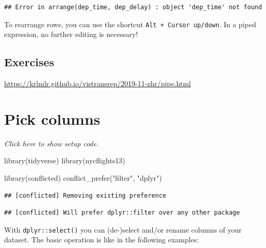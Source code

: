 \documentclass[]{book}
\newenvironment{Shaded}{}{}
\newcommand{\KeywordTok}[1]{\textcolor[rgb]{0.00,0.00,1.00}{#1}}
\newcommand{\NormalTok}[1]{#1}
\newcommand{\OperatorTok}[1]{#1}
\newcommand{\StringTok}[1]{\textcolor[rgb]{0.00,0.50,0.50}{#1}}
\begin{document}
\begin{verbatim}
## Error in arrange(dep_time, dep_delay) : object 'dep_time' not found
\end{verbatim}

To rearrange rows, you can use the shortcut \texttt{Alt\ +\ Cursor\ up/down}.
In a piped expression, no further editing is necessary!

\hypertarget{exercises-2}{%
\subsection*{Exercises}\label{exercises-2}}

\url{https://krlmlr.github.io/vistransrep/2019-11-zhr/pipe.html}

\hypertarget{pick-columns}{%
\section{Pick columns}\label{pick-columns}}

\emph{Click here to show setup code.}

\begin{Shaded}
\begin{Highlighting}[]
\KeywordTok{library}\NormalTok{(tidyverse)}
\KeywordTok{library}\NormalTok{(nycflights13)}

\KeywordTok{library}\NormalTok{(conflicted)}
\KeywordTok{conflict_prefer}\NormalTok{(}\StringTok{"filter"}\NormalTok{, }\StringTok{"dplyr"}\NormalTok{)}
\end{Highlighting}
\end{Shaded}

\begin{verbatim}
## [conflicted] Removing existing preference
\end{verbatim}

\begin{verbatim}
## [conflicted] Will prefer dplyr::filter over any other package
\end{verbatim}

With \texttt{dplyr::select()} you can (de-)select and/or rename columns of your dataset.
The basic operation is like in the following examples:

\begin{Shaded}
\end{Shaded}
\end{document}
